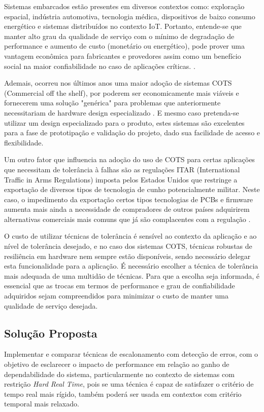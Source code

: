 Sistemas embarcados estão presentes em diversos contextos como:  exploração espacial, indústria automotiva, tecnologia médica, dispositivos de baixo consumo energético e sistemas distribuídos no contexto IoT. Portanto, entende-se que manter alto grau da qualidade de serviço com o mínimo de degradação de performance e aumento de custo (monetário ou energético), pode prover uma vantagem econômica para fabricantes e provedores assim como um benefício social na maior confiabilidade no caso de aplicações críticas. \cite{DependabilityInEmbeddedSystems}.

Ademais, ocorreu nos últimos anos uma maior adoção de sistemas COTS (Commercial off the shelf), por poderem ser economicamente mais viáveis e fornecerem uma solução "genérica" para problemas que anteriormente necessitariam de hardware design especializado \cite{CyberSecSpaceCOTS}. E mesmo caso pretenda-se utilizar um design especializado para o produto, estes sistemas são excelentes para a fase de prototipação e validação do projeto, dado sua facilidade de acesso e flexibilidade.

Um outro fator que influencia na adoção do uso de COTS para certas aplicações que necessitam de tolerância à falhas são as regulações ITAR (International Traffic in Arms Regulations) imposta pelos Estados Unidos que restringe a exportação de diversos tipos de tecnologia de cunho potencialmente militar. Neste caso, o impedimento da exportação certos tipos  tecnologias de PCBs e firmware aumenta mais ainda a necessidade de compradores de outros países adquirirem alternativas comerciais mais comuns que já são complacentes com a regulação \cite{ITARPCBCompliance}.

O custo de utilizar técnicas de tolerância é sensível ao contexto da aplicação e ao nível de tolerância desejado, e no caso dos sistemas COTS, técnicas robustas de resiliência em hardware nem sempre estão disponíveis, sendo necessário delegar esta funcionalidade para a aplicação. É necessário escolher a técnica de tolerância mais adequada de uma multidão de técnicas. Para que a escolha seja informada, é essencial que as trocas em termos de performance e grau de confiabilidade adquiridos sejam compreendidos para minimizar o custo de manter uma qualidade de serviço desejada.

\subsection{Solução Proposta}

Implementar e comparar técnicas de escalonamento com detecção de erros, com o objetivo de esclarecer o impacto de performance em relação ao ganho de dependabilidade do sistema, particularmente no contexto de sistemas com restrição \textit{Hard Real Time}, pois se uma técnica é capaz de satisfazer o critério de tempo real mais rígido, também poderá ser usada em contextos com critério temporal mais relaxado.

